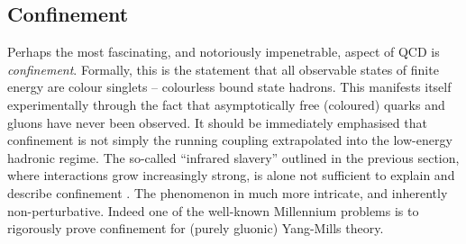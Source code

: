 \documentclass[11pt, a4paper, twoside]{book}
\begin{document}
\subsection{Confinement}
\label{sec:confinement}
Perhaps the most fascinating, and notoriously impenetrable, aspect of QCD is \emph{confinement}. Formally, this is the statement that all observable states of finite energy are colour singlets -- colourless bound state hadrons. This manifests itself experimentally through the fact that asymptotically free (coloured) quarks and gluons have never been observed. It should be immediately emphasised that confinement is not simply the running coupling extrapolated into the low-energy hadronic regime. The so-called ``infrared slavery'' outlined in the previous section, where interactions grow increasingly strong, is alone not sufficient to explain and describe confinement \cite{Greensite:2003bk}. The phenomenon in much more intricate, and inherently non-perturbative. Indeed one of the well-known Millennium problems \cite{Clay_problem} is to rigorously prove confinement for (purely gluonic) Yang-Mills theory.
\end{document}
